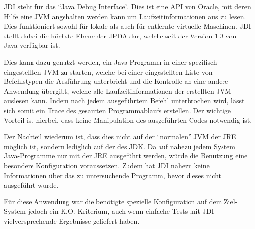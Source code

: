 \ac{JDI} steht für das "`Java Debug Interface"'. Dies ist eine \ac{API} von Oracle, mit deren Hilfe eine \ac{JVM} angehalten werden kann um Laufzeitinformationen aus zu lesen. Dies funktioniert sowohl für lokale als auch für entfernte virtuelle Maschinen. \ac{JDI} stellt dabei die höchste Ebene der \ac{JPDA} dar, welche seit der Version 1.3 von Java verfügbar ist.

Dies kann dazu genutzt werden, ein Java-Programm in einer spezifisch eingestellten \ac{JVM} zu starten, welche bei einer eingestellten Liste von Befehlstypen die Ausführung unterbricht und die Kontrolle an eine andere Anwendung übergibt, welche alle Laufzeitinformationen der erstellten \ac{JVM} auslesen kann. Indem nach jedem ausgeführtem Befehl unterbrochen wird, lässt sich somit ein Trace des gesamten Programmablaufs erstellen. Der wichtige Vorteil ist hierbei, dass keine Manipulation des ausgeführten Codes notwendig ist.

Der Nachteil wiederum ist, dass dies nicht auf der "`normalen"' \ac{JVM} der \ac{JRE} möglich ist, sondern lediglich auf der des \ac{JDK}. Da auf nahezu jedem System Java-Programme nur mit der \ac{JRE} ausgeführt werden, würde die Benutzung eine besondere Konfiguration voraussetzen. Zudem hat \ac{JDI} nahezu keine Informationen über das zu untersuchende Programm, bevor dieses nicht ausgeführt wurde.

Für diese Anwendung war die benötigte spezielle Konfiguration auf dem Ziel-System jedoch ein K.O.-Kriterium, auch wenn einfache Tests mit \ac{JDI} vielversprechende Ergebnisse geliefert haben.